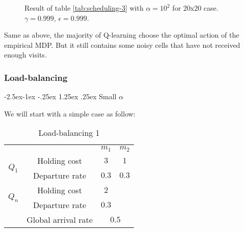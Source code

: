 \documentclass[
  a4paper, xcolor = usenames,dvipsnames]{article}
\makeatletter
\renewcommand\paragraph{\@startsection{paragraph}{4}{\z@}%
  {-2.5ex\@plus -1ex \@minus -.25ex}%
  {1.25ex \@plus .25ex}%
  {\normalfont\normalsize\bfseries}}
\theoremstyle{definition}
\theoremstyle{definition}
\theoremstyle{definition}
\theoremstyle{definition}
\theoremstyle{remark}
\makeatother
\begin{document}
\begin{figure}

{\centering {}

}

\caption{Result of table \ref{tab:scheduling-3} with \(\alpha = 10^{2}\) for 20x20 case. \(\gamma = 0.999\), \(\epsilon = 0.999\).}\label{fig:20x20-scheduling-5}
\end{figure}

Same as above, the majority of Q-learning choose the optimal action of the empirical MDP. But it still contains some noisy cells that have not received enough visits.

\hypertarget{load-balancing-1}{%
\subsubsection{Load-balancing}\label{load-balancing-1}}

\hypertarget{small-alpha-1}{%
\paragraph{\texorpdfstring{Small \(\alpha\)}{Small \textbackslash alpha}}\label{small-alpha-1}}

We will start with a simple case as follow:

\begin{table}[!htbp]
\caption{Load-balancing 1}
\begin{center}
\begin{tabular}{c c c c}
    \hline
    \multicolumn{2}{c}{} & $m_{1}$ & $m_{2}$ \\
    \cline{2-4}
    \multirow{2}{*}{$Q_{1}$} &  Holding cost & $3$ & $1$ \\
    & Departure rate & $0.3$ & $0.3$ \\
    \cline{2-4}
    \multirow{2}{*}{$Q_{n}$} &  Holding cost & $2$ & \\
    & Departure rate & $0.3$ & \\
    \cline{2-4}
    & Global arrival rate & \multicolumn{2}{c}{$0.5$} \\
    \hline
\end{tabular}
\end{center}
\label{tab:lb-1}
\end{table}
\end{document}

